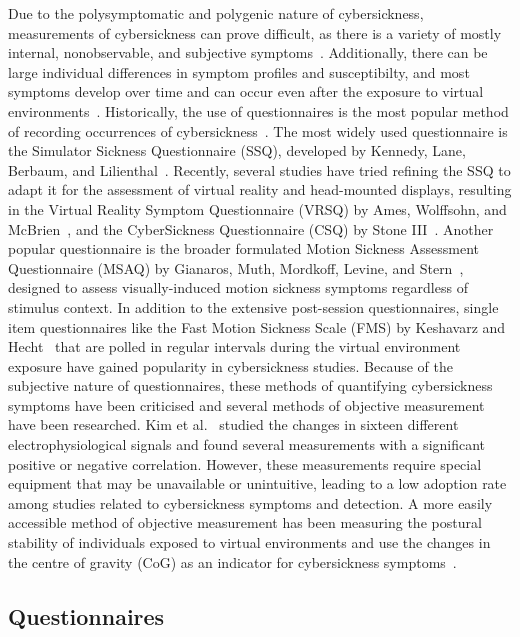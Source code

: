 Due to the polysymptomatic and polygenic nature of cybersickness, measurements of cybersickness can prove
difficult, as there is a variety of mostly internal, nonobservable, and subjective symptoms~\cite{McCauley1992}.
Additionally, there can be large individual differences in symptom profiles and susceptibilty, and most symptoms
develop over time and can occur even after the exposure to virtual environments~\cite{McCauley1992}.
Historically, the use of questionnaires is the most popular method of recording occurrences of
cybersickness~\cite{Rebenitsch2016,Saredakis2020}.
The most widely used questionnaire is the Simulator Sickness Questionnaire (SSQ), developed by Kennedy, Lane, Berbaum,
and Lilienthal~\cite{Kennedy1993}.
Recently, several studies have tried refining the SSQ to adapt it for the assessment of virtual reality and
head-mounted displays, resulting in the Virtual Reality Symptom Questionnaire (VRSQ) by Ames, Wolffsohn, and
McBrien~\cite{Ames2005}, and the CyberSickness Questionnaire (CSQ) by Stone III~\cite{Stone2017}.
Another popular questionnaire is the broader formulated Motion Sickness Assessment Questionnaire (MSAQ) by Gianaros,
Muth, Mordkoff, Levine, and Stern~\cite{Gianaros2001}, designed to assess visually-induced motion sickness symptoms
regardless of stimulus context.
In addition to the extensive post-session questionnaires, single item questionnaires like the Fast Motion Sickness
Scale (FMS) by Keshavarz and Hecht~\cite{Keshavarz2011} that are polled in regular intervals during the virtual
environment exposure have gained popularity in cybersickness studies.
Because of the subjective nature of questionnaires, these methods of quantifying cybersickness symptoms have been
criticised and several methods of objective measurement have been researched.
Kim et al.~\cite{Kim2005} studied the changes in sixteen different electrophysiological signals and found several
measurements with a significant positive or negative correlation.
However, these measurements require special equipment that may be unavailable or unintuitive, leading to a low
adoption rate among studies related to cybersickness symptoms and detection.
A more easily accessible method of objective measurement has been measuring the postural stability of individuals
exposed to virtual environments and use the changes in the centre of gravity (CoG) as an indicator for cybersickness
symptoms~\cite{Lim2020}.


\subsection{Questionnaires}\label{subsec:questionnaires}

